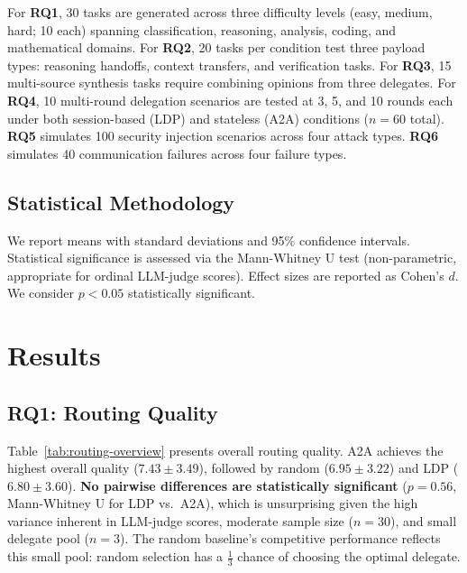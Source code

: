 \documentclass[11pt,a4paper]{article}
\newcommand{\ldp}{\textsc{LDP}}
\newcommand{\atoa}{\textsc{A2A}}
\newcommand{\RQ}[1]{\textbf{RQ#1}}
\begin{document}
For \RQ{1}, 30 tasks are generated across three difficulty levels (easy, medium, hard; 10 each) spanning classification, reasoning, analysis, coding, and mathematical domains. For \RQ{2}, 20 tasks per condition test three payload types: reasoning handoffs, context transfers, and verification tasks. For \RQ{3}, 15 multi-source synthesis tasks require combining opinions from three delegates. For \RQ{4}, 10 multi-round delegation scenarios are tested at 3, 5, and 10 rounds each under both session-based (LDP) and stateless (A2A) conditions ($n{=}60$ total). \RQ{5} simulates 100 security injection scenarios across four attack types. \RQ{6} simulates 40 communication failures across four failure types.

\subsection{Statistical Methodology}

We report means with standard deviations and 95\% confidence intervals. Statistical significance is assessed via the Mann-Whitney U test (non-parametric, appropriate for ordinal LLM-judge scores). Effect sizes are reported as Cohen's $d$. We consider $p < 0.05$ statistically significant.


\section{Results}
\label{sec:results}

\subsection{RQ1: Routing Quality}



Table~\ref{tab:routing-overview} presents overall routing quality. \atoa{} achieves the highest overall quality ($7.43 \pm 3.49$), followed by random ($6.95 \pm 3.22$) and \ldp{} ($6.80 \pm 3.60$). \textbf{No pairwise differences are statistically significant} ($p{=}0.56$, Mann-Whitney U for \ldp{} vs.\ \atoa{}), which is unsurprising given the high variance inherent in LLM-judge scores, moderate sample size ($n{=}30$), and small delegate pool ($n{=}3$). The random baseline's competitive performance reflects this small pool: random selection has a $\frac{1}{3}$ chance of choosing the optimal delegate.
\end{document}
